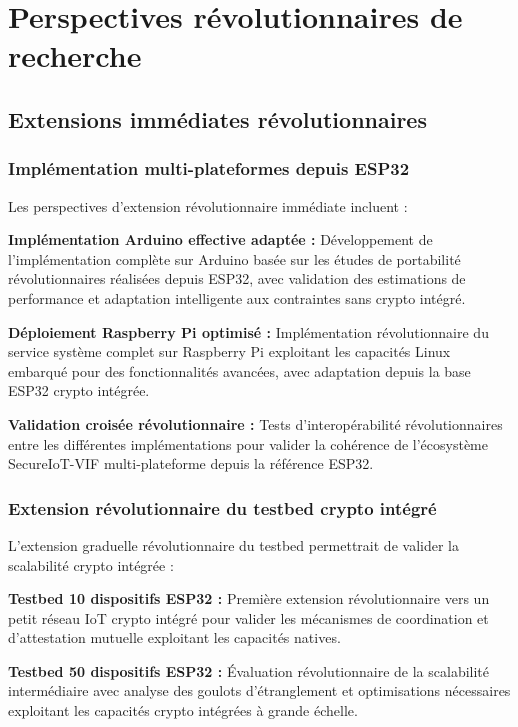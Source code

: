\section{Perspectives révolutionnaires de recherche}

\subsection{Extensions immédiates révolutionnaires}

\subsubsection{Implémentation multi-plateformes depuis ESP32}

Les perspectives d'extension révolutionnaire immédiate incluent :

\textbf{Implémentation Arduino effective adaptée :} Développement de l'implémentation complète sur Arduino basée sur les études de portabilité révolutionnaires réalisées depuis ESP32, avec validation des estimations de performance et adaptation intelligente aux contraintes sans crypto intégré.

\textbf{Déploiement Raspberry Pi optimisé :} Implémentation révolutionnaire du service système complet sur Raspberry Pi exploitant les capacités Linux embarqué pour des fonctionnalités avancées, avec adaptation depuis la base ESP32 crypto intégrée.

\textbf{Validation croisée révolutionnaire :} Tests d'interopérabilité révolutionnaires entre les différentes implémentations pour valider la cohérence de l'écosystème SecureIoT-VIF multi-plateforme depuis la référence ESP32.

\subsubsection{Extension révolutionnaire du testbed crypto intégré}

L'extension graduelle révolutionnaire du testbed permettrait de valider la scalabilité crypto intégrée :

\textbf{Testbed 10 dispositifs ESP32 :} Première extension révolutionnaire vers un petit réseau IoT crypto intégré pour valider les mécanismes de coordination et d'attestation mutuelle exploitant les capacités natives.

\textbf{Testbed 50 dispositifs ESP32 :} Évaluation révolutionnaire de la scalabilité intermédiaire avec analyse des goulots d'étranglement et optimisations nécessaires exploitant les capacités crypto intégrées à grande échelle.


